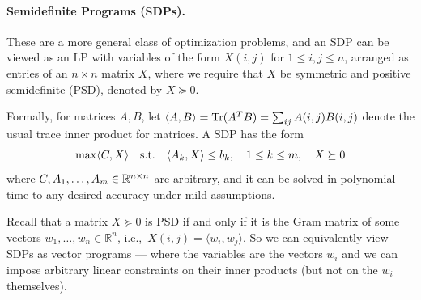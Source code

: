 

\paragraph{Semidefinite Programs (SDPs).} 
These 
are a more general class of optimization problems, and an SDP can be viewed as an LP with
variables of the form $X(i,j)$ for $1 \leq i,j \leq n$, arranged as entries of an $n\times n$ matrix $X$, where we require that $X$ be symmetric and positive semidefinite (PSD), denoted  by $X \succeq 0$.

Formally, for matrices $A,B$, let $\langle A, B\rangle = \text{Tr}(A^TB) = \sum_{ij} A(i,j) B(i,j)$ denote the usual trace inner product for matrices. A SDP has the form
\[
\max \langle C,X\rangle   \quad \text{s.t.} \quad  \langle A_k, X\rangle  \leq  b_k, \quad 1 \leq k \leq m,
\quad X  \succeq  0  \]
where $C,A_1,\ldots,A_m \in \mathbb{R}^{n\times n}$ are arbitrary, and it can be solved in polynomial time to any desired accuracy under mild assumptions. 

Recall that a matrix $X \succeq 0$ is PSD if and only if it is the Gram matrix of some vectors $w_1,\ldots,w_n \in \mathbb{R}^n$, i.e.,~$X(i,j)= \langle w_i,w_j \rangle$. So we can equivalently view SDPs as vector programs --- where the variables are the vectors $w_i$ and we can impose arbitrary linear constraints on their inner products (but not on the $w_i$ themselves).

\medskip

